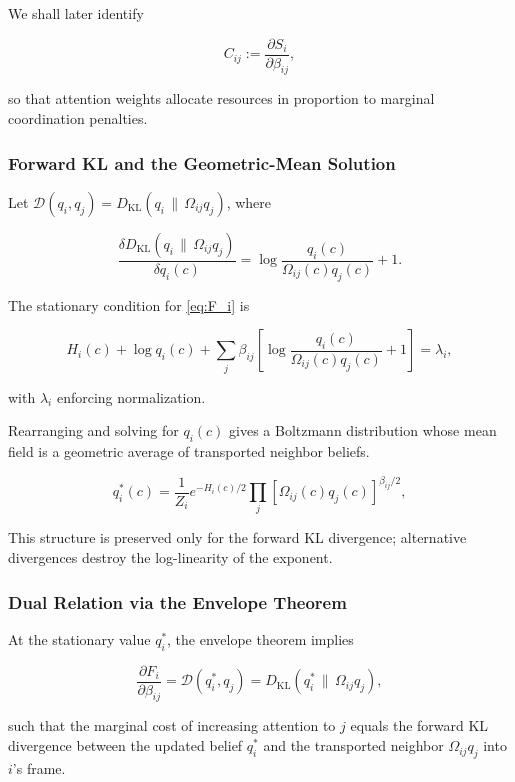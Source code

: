 \documentclass[twoside,11pt]{article}
\begin{document}
We shall later identify

\begin{equation}
C_{ij} := \frac{\partial S_i}{\partial \beta_{ij}},
\end{equation}

so that attention weights allocate resources in proportion to marginal coordination penalties.

\subsubsection{Forward KL and the Geometric-Mean Solution}
Let $\mathcal{D}(q_i,q_j) = D_{\mathrm{KL}}(q_i \,\|\, \Omega_{ij} q_j)$, where

\[
\frac{\delta D_{\mathrm{KL}}(q_i \,\|\, \Omega_{ij} q_j)}{\delta q_i(c)} 
= \log\frac{q_i(c)}{\Omega_{ij}(c) q_j(c)} + 1.
\]

The stationary condition for \eqref{eq:F_i} is

\begin{equation}
H_i(c)
+ \log q_i(c)
+ \sum_j \beta_{ij}
\!\left[
\log\frac{q_i(c)}{\Omega_{ij}(c)q_j(c)}+1
\right]
= \lambda_i,
\end{equation}

with $\lambda_i$ enforcing normalization.

Rearranging and solving for $q_i(c)$ gives a Boltzmann distribution whose mean field is a geometric average of transported neighbor beliefs.

\begin{equation}
q_i^*(c)
= \frac{1}{Z_i}
e^{-H_i(c)/2}
\prod_j
[\Omega_{ij}(c) q_j(c)]^{\beta_{ij}/2},
\label{eq:q_i_star}
\end{equation}

This structure is preserved only for the forward KL divergence; alternative divergences destroy the log-linearity of the exponent.

\subsubsection{Dual Relation via the Envelope Theorem}
At the stationary value $q_i^*$, the envelope theorem implies

\begin{equation}
\frac{\partial F_i}{\partial \beta_{ij}}
= \mathcal{D}(q_i^*, q_j)
= D_{\mathrm{KL}}(q_i^* \,\|\, \Omega_{ij} q_j),
\label{eq:envelope}
\end{equation}

such that the marginal cost of increasing attention to $j$ equals the forward KL divergence between the updated belief $q_i^*$ and the transported neighbor $\Omega_{ij} q_j$ into $i$'s frame.
\end{document}
